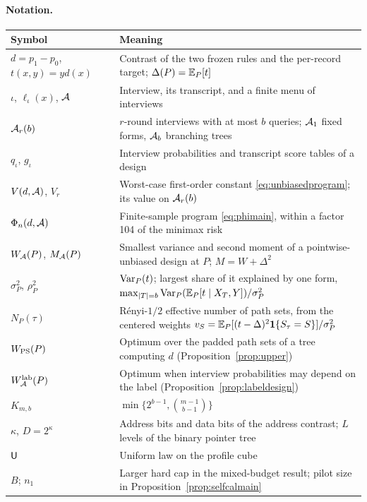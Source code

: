 \paragraph{Notation.}
\begin{center}\small
\begin{tabular}{lp{10.5cm}}
\toprule
Symbol & Meaning\\
\midrule
$d=p_1-p_0$, $t(x,y)=yd(x)$ & Contrast of the two frozen rules and the per-record target; $\Delta(P)=\mathbb{E}_P[t]$\\
$\iota$, $\ell_\iota(x)$, $\mathcal A$ & Interview, its transcript, and a finite menu of interviews\\
$\mathcal A_r(b)$ & $r$-round interviews with at most $b$ queries; $\mathcal A_1$ fixed forms, $\mathcal A_b$ branching trees\\
$q_\iota$, $g_\iota$ & Interview probabilities and transcript score tables of a design\\
$V(d,\mathcal A)$, $V_r$ & Worst-case first-order constant \eqref{eq:unbiasedprogram}; its value on $\mathcal A_r(b)$\\
$\Phi_n(d,\mathcal A)$ & Finite-sample program \eqref{eq:phimain}, within a factor 104 of the minimax risk\\
$W_\mathcal A(P)$, $M_\mathcal A(P)$ & Smallest variance and second moment of a pointwise-unbiased design at $P$; $M=W+\Delta^2$\\
$\sigma_P^2$, $\rho_P^2$ & $\operatorname{Var}_P(t)$; largest share of it explained by one form, $\max_{|T|=b}\operatorname{Var}_P(\mathbb{E}_P[t\mid X_T,Y])/\sigma_P^2$\\
$N_P(\tau)$ & R\'enyi-$1/2$ effective number of path sets, from the centered weights $v_S=\mathbb{E}_P[(t-\Delta)^2\mathbf 1\{S_\tau=S\}]/\sigma_P^2$\\
$W_{\rm PS}(P)$ & Optimum over the padded path sets of a tree computing $d$ (Proposition~\ref{prop:upper})\\
$W^{\rm lab}_\mathcal A(P)$ & Optimum when interview probabilities may depend on the label (Proposition~\ref{prop:labeldesign})\\
$K_{m,b}$ & $\min\{2^{b-1},\binom{m-1}{b-1}\}$\\
$\kappa$, $D=2^\kappa$ & Address bits and data bits of the address contrast; $L$ levels of the binary pointer tree\\
$\mathsf U$ & Uniform law on the profile cube\\
$B$; $n_1$ & Larger hard cap in the mixed-budget result; pilot size in Proposition~\ref{prop:selfcalmain}\\
\bottomrule
\end{tabular}
\end{center}

